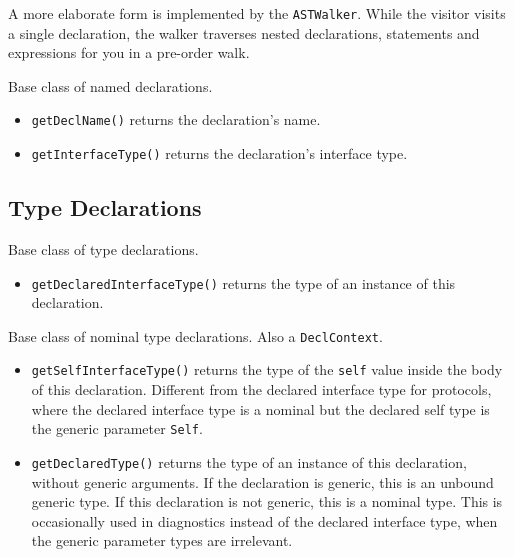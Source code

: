 \documentclass[../generics]{subfiles}
\begin{document}
A more elaborate form is implemented by the \texttt{ASTWalker}. While the visitor visits a single declaration, the walker traverses nested declarations, statements and expressions for you in a pre-order walk.

Base class of named declarations.

\begin{itemize}
\item \texttt{getDeclName()} returns the declaration's name.
\item \texttt{getInterfaceType()} returns the declaration's interface type.
\end{itemize}

\subsection*{Type Declarations}

Base class of type declarations.
\begin{itemize}
\item \texttt{getDeclaredInterfaceType()} returns the type of an instance of this declaration.
\end{itemize}

Base class of nominal type declarations. Also a \texttt{DeclContext}.
\begin{itemize}
\item \texttt{getSelfInterfaceType()} returns the type of the \texttt{self} value inside the body of this declaration. Different from the declared interface type for protocols, where the declared interface type is a nominal but the declared self type is the generic parameter \texttt{Self}.
\item \texttt{getDeclaredType()} returns the type of an instance of this declaration, without generic arguments. If the declaration is generic, this is an unbound generic type. If this declaration is not generic, this is a nominal type. This is occasionally used in diagnostics instead of the declared interface type, when the generic parameter types are irrelevant.
\end{itemize}
\end{document}
